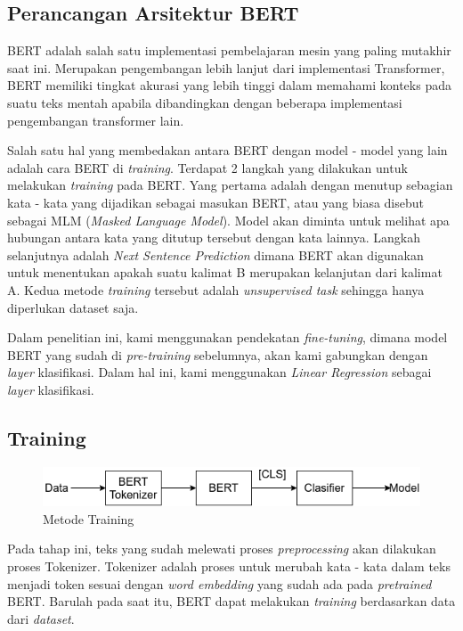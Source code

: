 \subsection{Perancangan Arsitektur BERT}
BERT adalah salah satu implementasi pembelajaran mesin yang paling mutakhir saat ini. Merupakan pengembangan lebih lanjut dari implementasi Transformer, BERT memiliki tingkat akurasi yang lebih tinggi dalam memahami konteks pada suatu teks mentah apabila dibandingkan dengan beberapa implementasi pengembangan transformer lain.

Salah satu hal yang membedakan antara BERT dengan model - model yang lain adalah cara BERT di \textit{training}. Terdapat 2 langkah yang dilakukan untuk melakukan \textit{training} pada BERT. Yang pertama adalah dengan menutup sebagian kata - kata yang dijadikan sebagai masukan BERT, atau yang biasa disebut sebagai MLM (\textit{Masked Language Model}). Model akan diminta untuk melihat apa hubungan antara kata yang ditutup tersebut dengan kata lainnya. Langkah selanjutnya adalah \textit{Next Sentence Prediction} dimana BERT akan digunakan untuk menentukan apakah suatu kalimat B merupakan kelanjutan dari kalimat A. Kedua metode \textit{training} tersebut adalah \textit{unsupervised task} sehingga hanya diperlukan dataset saja.

Dalam penelitian ini, kami menggunakan pendekatan \textit{fine-tuning}, dimana model BERT yang sudah di \textit{pre-training} sebelumnya, akan kami gabungkan dengan \textit{layer} klasifikasi. Dalam hal ini, kami menggunakan \textit{Linear Regression} sebagai \textit{layer} klasifikasi.

\subsection{Training}

\begin{figure}[h!]
    \begin{center}
        \includegraphics[width= 0.9\linewidth]{gambar/training.png}
        \caption{Metode Training}
        \label{fig: metodologi_training}
    \end{center}
\end{figure}

Pada tahap ini, teks yang sudah melewati proses \textit{preprocessing} akan dilakukan proses Tokenizer. Tokenizer adalah proses untuk merubah kata - kata dalam teks menjadi token sesuai dengan \textit{word embedding} yang sudah ada pada \textit{pretrained} BERT. Barulah pada saat itu, BERT dapat melakukan \textit{training} berdasarkan data dari \textit{dataset}.

